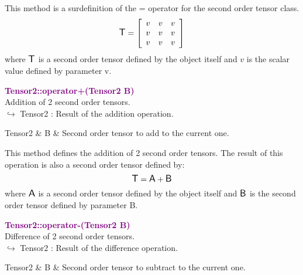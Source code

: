 This method is a surdefinition of the = operator for the second order tensor class.
\begin{equation*}
\mbox{\large\ensuremath{\mathsf{T}}}=\left[\begin{array}{ccc}
v & v & v\\
v & v & v\\
v & v & v
\end{array}\right]
\end{equation*}
where $\mbox{\large\ensuremath{\mathsf{T}}}$ is a second order tensor defined by the object itself and $v$ is the scalar value defined by parameter v.

\textcolor{purple}{\textbf{Tensor2::operator+(Tensor2 B)}}\label{Tensor2::operator+(Tensor2 B)}\\
Addition of 2 second order tensors.\\ \hspace*{10mm}$\hookrightarrow$ Tensor2 : Result of the addition operation.

\begin{tcolorbox}[width=\textwidth,myArgs,tabularx={ll|R}]
Tensor2 & B & Second order tensor to add to the current one.
\end{tcolorbox}

This method defines the addition of 2 second order tensors.
The result of this operation is also a second order tensor defined by:
\begin{equation*}
\mbox{\large\ensuremath{\mathsf{T}}} = \mbox{\large\ensuremath{\mathsf{A}}} + \mbox{\large\ensuremath{\mathsf{B}}}
\end{equation*}
where $\mbox{\large\ensuremath{\mathsf{A}}}$ is a second order tensor defined by the object itself and $\mbox{\large\ensuremath{\mathsf{B}}}$ is the second order tensor defined by parameter B.

\textcolor{purple}{\textbf{Tensor2::operator-(Tensor2 B)}}\label{Tensor2::operator-(Tensor2 B)}\\
Difference of 2 second order tensors.\\ \hspace*{10mm}$\hookrightarrow$ Tensor2 : Result of the difference operation.

\begin{tcolorbox}[width=\textwidth,myArgs,tabularx={ll|R}]
Tensor2 & B & Second order tensor to subtract to the current one.
\end{tcolorbox}

